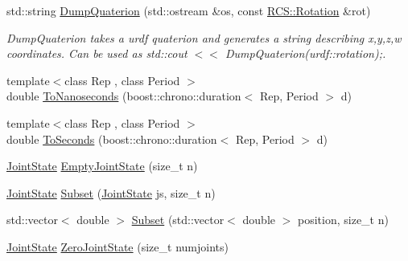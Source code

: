\begin{DoxyCompactItemize}
std\-::string \hyperlink{namespaceRCS_a994378d2744371f1afac4b59a808fef2}{Dump\-Quaterion} (std\-::ostream \&os, const \hyperlink{namespaceRCS_a3fd915276fdb632d217c560523c320e0}{R\-C\-S\-::\-Rotation} \&rot)
\begin{DoxyCompactList}\small\item\em Dump\-Quaterion takes a urdf quaterion and generates a string describing x,y,z,w coordinates. Can be used as std\-::cout $<$$<$ Dump\-Quaterion(urdf\-::rotation);. \end{DoxyCompactList}\item 
{\footnotesize template$<$class Rep , class Period $>$ }\\double \hyperlink{namespaceRCS_a1d588bfecc6b5d8e671ad9c57d18ecdc}{To\-Nanoseconds} (boost\-::chrono\-::duration$<$ Rep, Period $>$ d)
\item 
{\footnotesize template$<$class Rep , class Period $>$ }\\double \hyperlink{namespaceRCS_a82f7cfa7edd613a454281ce5f5685b4d}{To\-Seconds} (boost\-::chrono\-::duration$<$ Rep, Period $>$ d)
\item 
\hyperlink{RCS_8h_aa4adb93a26caa4dacba9c9614e283245}{Joint\-State} \hyperlink{namespaceRCS_a41308a2a3e1a110ee397e99e88d355ff}{Empty\-Joint\-State} (size\-\_\-t n)
\item 
\hyperlink{RCS_8h_aa4adb93a26caa4dacba9c9614e283245}{Joint\-State} \hyperlink{namespaceRCS_a5cfe0b45d035674a7235c97757b670ff}{Subset} (\hyperlink{RCS_8h_aa4adb93a26caa4dacba9c9614e283245}{Joint\-State} js, size\-\_\-t n)
\item 
std\-::vector$<$ double $>$ \hyperlink{namespaceRCS_af77528d0878b59af2a466a79bcd62983}{Subset} (std\-::vector$<$ double $>$ position, size\-\_\-t n)
\item 
\hyperlink{RCS_8h_aa4adb93a26caa4dacba9c9614e283245}{Joint\-State} \hyperlink{namespaceRCS_a8debd3f8ffa83ac05085e84bf814640f}{Zero\-Joint\-State} (size\-\_\-t numjoints)
\end{DoxyCompactItemize}
